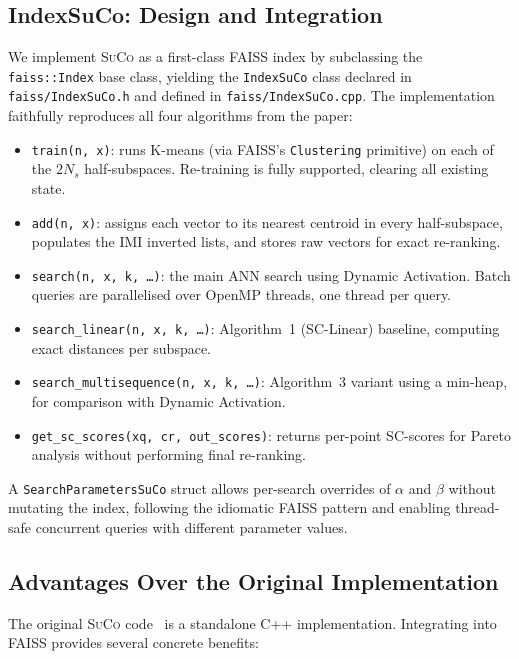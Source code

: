 \documentclass[11pt,a4paper]{article}
\newcommand{\suco}{\textsc{SuCo}}
\newcommand{\NS}{N_s}
\begin{document}
\subsection{IndexSuCo: Design and Integration}

We implement \suco{} as a first-class FAISS index by subclassing the
\texttt{faiss::Index} base class, yielding the \texttt{IndexSuCo} class
declared in \texttt{faiss/IndexSuCo.h} and defined in
\texttt{faiss/IndexSuCo.cpp}.  The implementation faithfully reproduces all
four algorithms from the paper:

\begin{itemize}
  \item \texttt{train(n, x)}: runs K-means (via FAISS's \texttt{Clustering}
    primitive) on each of the $2\NS$ half-subspaces.  Re-training is fully
    supported, clearing all existing state.
  \item \texttt{add(n, x)}: assigns each vector to its nearest centroid in
    every half-subspace, populates the IMI inverted lists, and stores raw
    vectors for exact re-ranking.
  \item \texttt{search(n, x, k, \ldots)}: the main ANN search using Dynamic
    Activation.  Batch queries are parallelised over OpenMP threads, one
    thread per query.
  \item \texttt{search\_linear(n, x, k, \ldots)}: Algorithm~1 (SC-Linear)
    baseline, computing exact distances per subspace.
  \item \texttt{search\_multisequence(n, x, k, \ldots)}: Algorithm~3 variant
    using a min-heap, for comparison with Dynamic Activation.
  \item \texttt{get\_sc\_scores(xq, cr, out\_scores)}: returns per-point
    SC-scores for Pareto analysis without performing final re-ranking.
\end{itemize}

A \texttt{SearchParametersSuCo} struct allows per-search overrides of
$\alpha$ and $\beta$ without mutating the index, following the idiomatic FAISS
pattern and enabling thread-safe concurrent queries with different parameter
values.

\subsection{Advantages Over the Original Implementation}

The original \suco{} code~\cite{wei2025suco_code} is a standalone C++
implementation.  Integrating into FAISS provides several concrete benefits:
\end{document}
